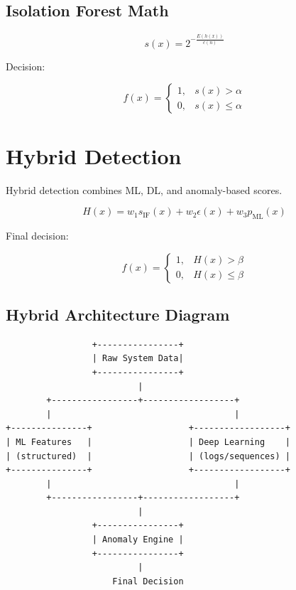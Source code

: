 \documentclass[12pt, draftclsnofoot, onecolumn]{IEEEtran}
\begin{document}
\subsection{Isolation Forest Math}


\[
s(x) = 2^{-\frac{E(h(x))}{c(n)}}
\]



Decision:


\[
f(x) =
\begin{cases}
1, & s(x) > \alpha \\
0, & s(x) \le \alpha
\end{cases}
\]



\section{Hybrid Detection}
Hybrid detection combines ML, DL, and anomaly-based scores.



\[
H(x) = w_1 s_{\text{IF}}(x) + w_2 \epsilon(x) + w_3 p_{\text{ML}}(x)
\]



Final decision:


\[
f(x) =
\begin{cases}
1, & H(x) > \beta \\
0, & H(x) \le \beta
\end{cases}
\]



\subsection{Hybrid Architecture Diagram}
\begin{verbatim}
                 +----------------+
                 | Raw System Data|
                 +----------------+
                          |
        +-----------------+------------------+
        |                                    |
+---------------+                   +------------------+
| ML Features   |                   | Deep Learning    |
| (structured)  |                   | (logs/sequences) |
+---------------+                   +------------------+
        |                                    |
        +-----------------+------------------+
                          |
                 +----------------+
                 | Anomaly Engine |
                 +----------------+
                          |
                     Final Decision
\end{verbatim}
\end{document}
